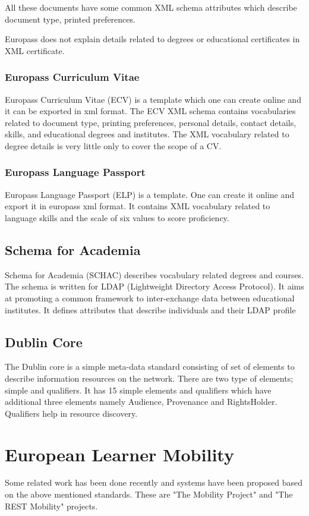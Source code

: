 \documentclass[12pt,a4paper,oneside]{book}
\begin{document}
    All these documents have some common XML schema attributes which describe document type, printed preferences.

    Europass does not explain details related to degrees or educational certificates in XML certificate.

        \subsubsection{Europass Curriculum Vitae}
        Europass Curriculum Vitae (ECV) is a template which one can create online and it can be exported in xml format. The ECV XML schema contains vocabularies related to document type, printing preferences, personal details, contact details, skills, and educational degrees and institutes. The XML vocabulary related to degree details is very little only to cover the scope of a CV.

        \subsubsection{Europass Language Passport}
        Europass Language Passport (ELP) is a template. One can create it online and export it in europass xml format. It contains XML vocabulary related to language skills and the scale of six values to score proficiency.

    \subsection{Schema for Academia}
    Schema for Academia (SCHAC) describes vocabulary related degrees and courses. The schema is written for LDAP (Lightweight Directory Access Protocol). It aims at promoting a common framework to inter-exchange data between educational institutes. It defines attributes that describe individuals and their LDAP profile

    \subsection{Dublin Core}
    The Dublin core is a simple meta-data standard consisting of set of elements to describe information resources on the network. There are two type of elements; simple and qualifiers. It has 15 simple elements and qualifiers which have additional three elements namely Audience, Provenance and RightsHolder. Qualifiers help in resource discovery.

\section{European Learner Mobility}
Some related work has been done recently and systems have been proposed based on the above mentioned standards. These are "The Mobility Project" and "The REST Mobility" projects.
\end{document}
